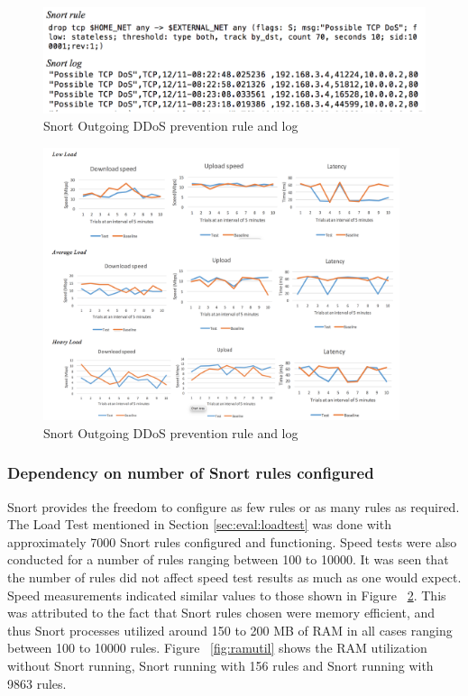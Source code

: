   \begin{figure}
    \centering
    \includegraphics[width=0.95\linewidth]{figs/ddosrule.png}
    \caption{Snort Outgoing DDoS prevention rule and log}
    \label{fig:snortrule1}
\end{figure}

\begin{figure}
    \centering
    \includegraphics[width=0.95\linewidth, height=8cm]{figs/graph.png}
    \caption{Snort Outgoing DDoS prevention rule and log}
    \label{fig:graph}
\end{figure}

\subsubsection{Dependency on number of Snort rules configured}
Snort provides the freedom to configure as few rules or as many rules as required. The Load Test mentioned in Section \ref{sec:eval:loadtest} was done with approximately 7000 Snort rules configured and functioning. Speed tests were also conducted for a number of rules ranging between 100 to 10000. It was seen that the number of rules did not affect speed test results as much as one would expect. Speed measurements indicated similar values to those shown in Figure ~\ref{fig:graph}. This was attributed to the fact that Snort rules chosen were memory efficient, and thus Snort processes utilized around 150 to 200 MB of RAM in all cases ranging between 100 to 10000 rules. Figure ~\ref{fig:ramutil} shows the RAM utilization without Snort running, Snort running with 156 rules and Snort running with 9863 rules. \\

